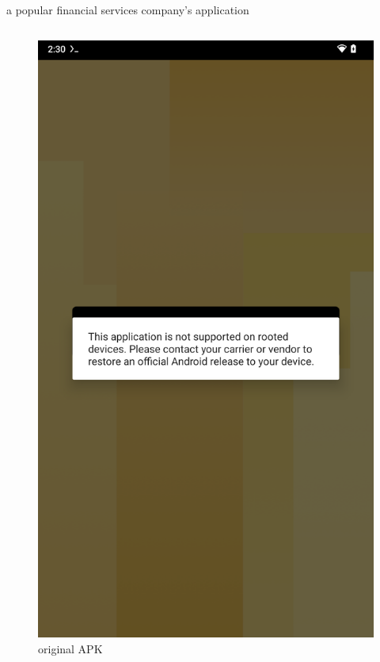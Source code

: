 \documentclass{beamer}
\begin{document}
\begin{frame}[fragile]{a popular financial services company's application}

    \begin{columns}
        \begin{figure}
            \centering
            \includegraphics[scale=0.07]{wu.png}
            \caption{original APK}
        \end{figure}

\end{columns}
\end{frame}
\end{document}

